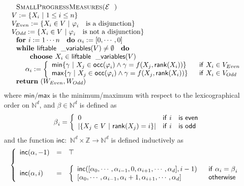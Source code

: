 \documentclass{article}
\begin{document}
\begin{equation*}
\begin{array}{l}
\text{\textsc{SmallProgressMeasures(}}\mathcal{E}\text{\textsc{)}} \\ 
V:=\{X_{i}\ |\ 1\leq i\leq n\} \\ 
V_{Even}:=\{X_{i}\in V\ |\ \mathsf{\varphi }_{i}~\text{is a disjunction}\}
\\ 
V_{Odd}:=\{X_{i}\in V\ |\ \mathsf{\varphi }_{i}~\text{is not a disjunction}\}
\\ 
\text{\textbf{for }}i:=1\cdots n\text{ \textbf{do }}\mathcal{\alpha }%
_{i}:=[0,\cdots ,0] \\ 
\text{\textbf{while }}\mathsf{liftable\_variables}(V)\neq \emptyset \text{ 
\textbf{do}} \\ 
\qquad \text{\textbf{choose }}X_{i}\in \mathsf{liftable\_variables}(V) \\ 
\qquad \mathcal{\alpha }_{i}:=\left\{ 
\begin{array}{ll}
\mathsf{min}\{\gamma \ |\ X_{j}\in \mathsf{\mathsf{occ}}(\varphi _{i})\wedge
\gamma =f(X_{j},\mathsf{rank}(X_{i}))\mathsf{\}} & \text{\textsf{if}}\
X_{i}\in V_{Even} \\ 
\mathsf{max}\{\gamma \ |\ X_{j}\in \mathsf{\mathsf{occ}}(\varphi _{i})\wedge
\gamma =f(X_{j},\mathsf{rank}(X_{i}))\mathsf{\}} & \text{\textsf{if}}\
X_{i}\in V_{Odd}%
\end{array}%
\right. \\ 
\text{\textbf{return} }(W_{Even},W_{Odd})%
\end{array}%
\end{equation*}%
where $\mathsf{min/max}$ is the minimum/maximum with respect to the
lexicographical order on $\mathbb{N}^{d}$, and $\beta \in \mathbb{N}^{d}$ is
defined as%
\begin{equation*}
\beta _{i}=\left\{ 
\begin{array}{ll}
0 & \mathsf{if}\ i\text{ \textsf{is even}} \\ 
|\{X_{j}\in V\ |\ \mathsf{rank}(X_{j})=i\}| & \mathsf{if}\ i\text{ \textsf{%
is odd}}%
\end{array}%
\right.
\end{equation*}%
and the function $\mathsf{inc:}$ $\mathbb{N}^{d}\times \mathbb{Z}\rightarrow 
\mathbb{N}^{d}$ is defined inductively as%
\begin{equation*}
\left\{ 
\begin{array}{lll}
\mathsf{inc}(\alpha ,-1) & = & \top \\ 
&  &  \\ 
\mathsf{inc}(\alpha ,i) & = & \left\{ 
\begin{array}{ll}
\mathsf{inc}([\alpha _{0},\cdots ,\alpha _{i-1},0,\alpha _{i+1},\cdots
,\alpha _{d}],i-1) & \text{\textsf{if}}\ \alpha _{i}=\beta _{i} \\ 
\lbrack \alpha _{0},\cdots ,\alpha _{i-1},\alpha _{i}+1,\alpha _{i+1},\cdots
,\alpha _{d}] & \text{\textsf{otherwise}}%
\end{array}%
\right.%
\end{array}%
\right.
\end{equation*}%
\end{document}
